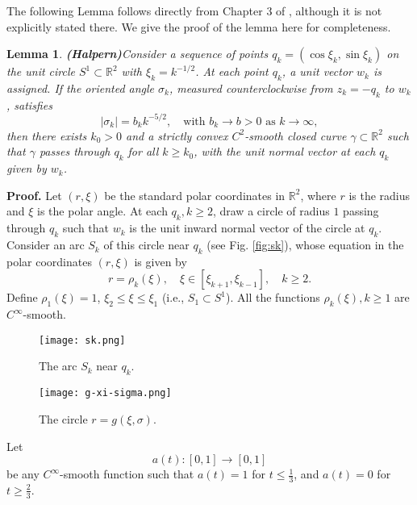 \documentclass[12pt]{article}
\newtheorem{lemma}{Lemma}
\begin{document}
The following Lemma follows directly from Chapter 3 of \cite{Hal}, although it is not explicitly stated there. 
We give the proof of the lemma here for completeness.
\begin{lemma} {\bf (Halpern)}\label{lem:Hal}
  Consider a sequence of points 
  $q_k = (\cos \xi_k, \sin \xi_k)$ on the unit circle 
  $S^1 \subset \mathbb{R}^2$ with $\xi_k = k^{-1/2}$. 
  At each point $q_k$, a unit vector $w_k$ is assigned. 
  If the oriented angle $ \sigma_k $, measured counterclockwise from $z_k = -q_k $ to $ w_k $, satisfies  
  \begin{equation}\label{eq:asym}
      \left| \sigma_k \right| = b_k k^{-5/2}, \quad \text{with } b_k \to b > 0 \text{ as } k \to \infty,
  \end{equation}
  then there exists $k_0 > 0$ and a strictly convex $C^2$-smooth closed curve 
  $ \gamma \subset \mathbb{R}^2 $ such that $ \gamma $ passes through $q_k$ for all $k \geq k_0$, with the unit normal vector at each $q_k$ given by $w_k$.
\end{lemma}
\textbf{Proof.}
Let $(r, \xi)$ be the standard polar coordinates in $\mathbb{R}^2$, 
where $r$ is the radius and $\xi$ is the polar angle.
At each $q_k, k\geq 2$, draw a circle of radius $1$ passing through $q_k$ 
such that $w_k$ is the unit inward normal vector of the circle at $q_k$.
Consider an arc $S_k$ of this circle near $q_k$ (see Fig. \ref{fig:sk}), 
whose equation in the polar coordinates $(r,\xi)$ is given by 
$$
r = \rho_k(\xi),
\quad \xi \in \left[\xi_{k+1}, \xi_{k-1}\right], 
\quad  k\geq 2.
$$
Define $\rho_1(\xi)=1$, $\xi_2 \leq \xi \leq \xi_1$ 
(i.e., $S_1\subset S^1$). 
All the functions
$\rho_k(\xi), k\geq 1$ are $C^{\infty}$-smooth.
\begin{figure}[htbp]
	\centering
	\begin{minipage}[t]{0.3\linewidth}
		\centering
		\texttt{[image: sk.png]}
    \caption{
      The arc $S_k$ near $q_k$.
    }
    \label{fig:sk}
	\end{minipage}
  \hspace{1cm}
  \begin{minipage}[t]{0.45\linewidth}
		\centering
		\texttt{[image: g-xi-sigma.png]}
    \caption{
The circle $r= g(\xi, \sigma)$. 
    }
    \label{fig:g-xi-sigma}
	\end{minipage}
\end{figure}
Let 
$$a(t): [0,1] \to [0,1]$$ 
be any $C^{\infty}$-smooth function such that $a(t) = 1$ for $t \leq \frac{1}{3}$, 
and $a(t) = 0$ for $t \geq \frac{2}{3}$.
\end{document}

